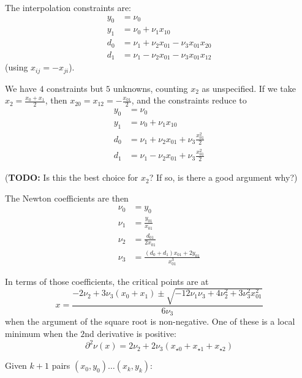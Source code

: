 The interpolation constraints are:
\begin{align}
y_0 & = \nu_0 
\\
y_1 & = \nu_0 + \nu_1 x_{10}  
\nonumber 
\\
d_0 & = \nu_1 + \nu_2 x_{01} - \nu_3 x_{01} x_{20} 
\\
d_1 & = \nu_1 - \nu_2 x_{01} - \nu_3 x_{01} x_{12} 
\nonumber
\end{align}
(using $x_{ij} = - x_{ji}$).

We have $4$ constraints but $5$ unknowns, counting $x_2$
as unspecified.
If we take $x_2 = \frac{x_0 + x_1}{2}$,
then $x_{20} = x_{12} = -\frac{x_{01}}{2}$,
and the constraints reduce to
\begin{align}
y_0 & = \nu_0 
\\
y_1 & = \nu_0 + \nu_1 x_{10}  
\nonumber 
\\
d_0 & = \nu_1 + \nu_2 x_{01} + \nu_3 \frac{x_{01}^2}{2} 
\\
d_1 & = \nu_1 - \nu_2 x_{01} + \nu_3 \frac{x_{01}^2}{2} 
\nonumber
\end{align}

(\textbf{TODO:} Is this the best choice for $x_2$? 
If so, is there a good argument why?)

The Newton coefficients are then
\begin{align}
\nu_0 & = y_0 
\\
\nu_1 & = \frac{y_{01}}{x_{01}}
\nonumber
\\ 
\nu_2 & = \frac{d_{01}}{2 x_{01}}
\nonumber
\\ 
\nu_3 & = \frac{ \left(d_0 + d_1 \right) x_{01} + 2 y_{01}}{x_{01}^3}
\nonumber
\end{align} 

In terms of those coefficients, the critical points are at
\begin{equation}
x=\frac{-2 \nu_2 + 3 \nu_3 \left( x_0 + x_1 \right) 
\pm \sqrt{-12 \nu_1 \nu_3 + 4 \nu_2^{2} + 3 \nu_3^{2} x_{01}^{2}}
}
{ 6 \nu_3}
\end{equation}
when the argument of the square root is non-negative.
One of these is a local minimum when the $2$nd derivative is positive:
\begin{equation}
\partial^2 \nu(x) = 2\nu_2
 + 2 \nu_3 \left(x_{{\star}0} + x_{{\star}1} + x_{{\star}2}\right)
\end{equation}

\newpage
\label{sec:Divided-differences}
\cite{wiki:Divided-differences}
Given $k+1$ pairs 
$\left( x_0, y_0 \right) \ldots \left( x_k, y_k \right) $:

